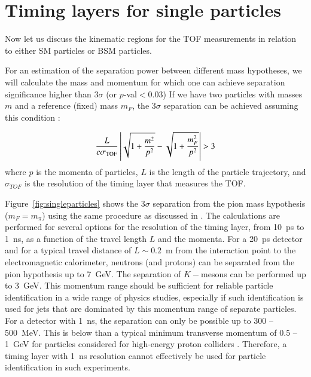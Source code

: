 \section{Timing layers for single particles}

Now let us discuss the kinematic regions for the TOF measurements in relation to
either SM particles or BSM particles. 
 
For an estimation of the separation power between different mass hypotheses, we will
calculate the mass and momentum for which one can achieve separation significance higher than $3\sigma$ (or $p$-val$<0.03$)
If we have two particles with masses $m$ and a reference (fixed) mass $m_F$, the $3\sigma$ separation can be 
achieved assuming this condition  \cite{Cerri:2018rkm}:

\begin{equation}
\frac{L}{c \sigma_{\textsc{TOF}}}\left|\sqrt{1+\frac{m^2}{p^2}} - \sqrt{1+\frac{m_F^2}{p^2}}\right| > 3
\label{eqTOF}
\end{equation}
where $p$ is the momenta of particles, $L$  is the length of the particle trajectory, and $\sigma_{TOF}$ is the
resolution  of the timing layer that measures the TOF.

Figure~\ref{fig:singleparticles} shows the $3\sigma$ separation from the pion
mass hypothesis ($m_F=m_{\pi}$) using the same procedure as discussed  in \cite{Cerri:2018rkm}. The 
calculations are performed for several options for the resolution of the timing layer, from 10~ps to 1~ns,
as a function of the travel length $L$ and the momenta. For a 20~ps detector and  for a typical travel 
distance of $L\sim 0.2$~m from the interaction point to the 
electromagnetic calorimeter, neutrons (and protons) can be separated from the pion hypothesis up to 7~GeV. The separation of $K-$mesons can be performed up to 3~GeV.
This momentum range should be sufficient for reliable particle identification in a wide range 
of physics studies, especially if such identification is used for jets that are dominated
by this momentum range of separate particles.
For a detector  with 1~ns, the separation can only be possible  up to  300 -- 500~MeV. This is below  than a typical
minimum transverse momentum of 0.5 -- 1~GeV for particles considered for high-energy proton colliders .
Therefore, a timing layer with 1~ns resolution cannot effectively be used for particle identification in such experiments.

